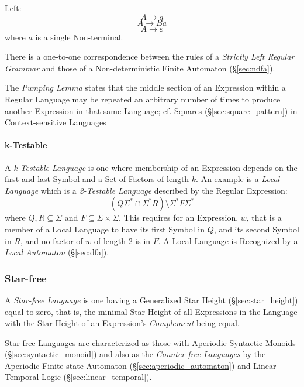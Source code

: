 Left:
\[
  A \rightarrow a
\]\[
  A \rightarrow Ba
\]\[
  A \rightarrow \varepsilon
\]
where $a$ is a single Non-terminal.

There is a one-to-one correspondence between the rules of a
\emph{Strictly Left Regular Grammar} and those of a Non-deterministic
Finite Automaton (\S\ref{sec:ndfa}).

The \emph{Pumping Lemma} states that the middle section of an
Expression within a Regular Language may be repeated an arbitrary
number of times to produce another Expression in that same Language;
cf. Squares (\S\ref{sec:square_pattern}) in Context-sensitive
Languages



\paragraph{k-Testable}\label{sec:k_testable}\hfill

A \emph{k-Testable Language} is one where membership of an Expression
depends on the first and last Symbol and a Set of Factors of length
$k$. An example is a \emph{Local Language} which is a \emph{2-Testable
  Language} described by the Regular Expression:
\[
  (Q\Sigma^* \cap \Sigma^*R)\setminus\Sigma^*F\Sigma^*
\]
where $Q,R \subseteq \Sigma$ and $F \subseteq \Sigma \times \Sigma$.
This requires for an Expression, $w$, that is a member of a Local
Language to have its first Symbol in $Q$, and its second Symbol in
$R$, and no factor of $w$ of length 2 is in $F$. A Local Language is
Recognized by a \emph{Local Automaton} (\S\ref{sec:dfa}).



\subsubsection{Star-free}\label{sec:starfree_grammar}

A \emph{Star-free Language} is one having a Generalized Star Height
(\S\ref{sec:star_height}) equal to zero, that is, the minimal Star
Height of all Expressions in the Language with the Star Height of an
Expression's \emph{Complement} being equal.

Star-free Languages are characterized as those with Aperiodic
Syntactic Monoids
(\S\ref{sec:syntactic_monoid})\cite{schutzenberger65} and also as the
\emph{Counter-free Languages}\cite{mcnaughton-papert71} by the
Aperiodic Finite-state Automaton (\S\ref{sec:aperiodic_automaton}) and
Linear Temporal Logic (\S\ref{sec:linear_temporal}).



